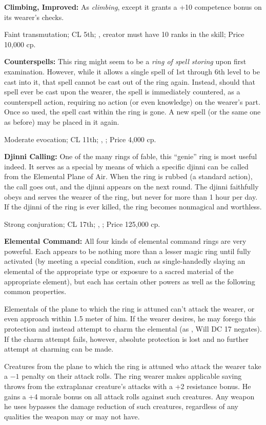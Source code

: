 \textbf{Climbing, Improved:} As \emph{climbing}, except it grants a +10 competence bonus on its wearer's  checks.

Faint transmutation; CL 5th; , creator must have 10 ranks in the  skill; Price 10,000 cp.

\textbf{Counterspells:} This ring might seem to be a \emph{ring of spell storing} upon first examination. However, while it allows a single spell of 1st through 6th level to be cast into it, that spell cannot be cast out of the ring again. Instead, should that spell ever be cast upon the wearer, the spell is immediately countered, as a counterspell action, requiring no action (or even knowledge) on the wearer's part. Once so used, the spell cast within the ring is gone. A new spell (or the same one as before) may be placed in it again.

Moderate evocation; CL 11th; , ; Price 4,000 cp.

\textbf{Djinni Calling:} One of the many rings of fable, this ``genie'' ring is most useful indeed. It serves as a special  by means of which a specific djinni can be called from the Elemental Plane of Air. When the ring is rubbed (a standard action), the call goes out, and the djinni appears on the next round. The djinni faithfully obeys and serves the wearer of the ring, but never for more than 1 hour per day. If the djinni of the ring is ever killed, the ring becomes nonmagical and worthless.

Strong conjuration; CL 17th; , ; Price 125,000 cp.

\textbf{Elemental Command:} All four kinds of elemental command rings are very powerful. Each appears to be nothing more than a lesser magic ring until fully activated (by meeting a special condition, such as single-handedly slaying an elemental of the appropriate type or exposure to a sacred material of the appropriate element), but each has certain other powers as well as the following common properties.

Elementals of the plane to which the ring is attuned can't attack the wearer, or even approach within 1.5 meter of him. If the wearer desires, he may forego this protection and instead attempt to charm the elemental (as , Will DC 17 negates). If the charm attempt fails, however, absolute protection is lost and no further attempt at charming can be made.

Creatures from the plane to which the ring is attuned who attack the wearer take a $-1$ penalty on their attack rolls. The ring wearer makes applicable saving throws from the extraplanar creature's attacks with a +2 resistance bonus. He gains a +4 morale bonus on all attack rolls against such creatures. Any weapon he uses bypasses the damage reduction of such creatures, regardless of any qualities the weapon may or may not have.

